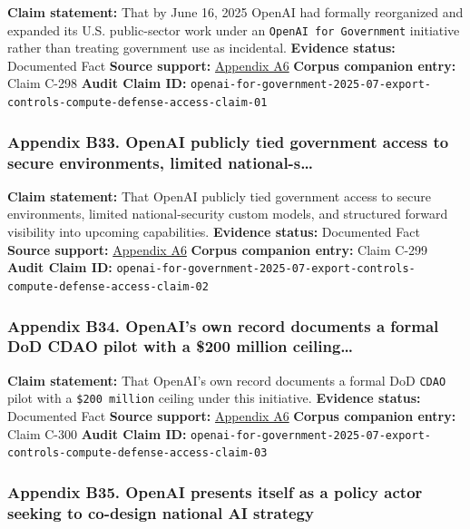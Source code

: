 \documentclass[
  american,
  11pt,
  letterpaper,
]{article}
\begin{document}
\textbf{Claim statement:} That by June 16, 2025 OpenAI had formally
reorganized and expanded its U.S. public-sector work under an
\texttt{OpenAI\ for\ Government} initiative rather than treating
government use as incidental. \textbf{Evidence status:} Documented Fact
\textbf{Source support:}
\hyperref[appendix-a6-introducing-openai-for-government]{Appendix A6}
\textbf{Corpus companion entry:} Claim C-298 \textbf{Audit Claim ID:}
\texttt{openai-for-government-2025-07-export-controls-compute-defense-access-claim-01}

\subsubsection{Appendix B33. OpenAI publicly tied government access to
secure environments, limited
national-s\ldots{}}\label{appendix-b33-openai-publicly-tied-government-access-to-secure-environments-limited-national-s}

\textbf{Claim statement:} That OpenAI publicly tied government access to
secure environments, limited national-security custom models, and
structured forward visibility into upcoming capabilities.
\textbf{Evidence status:} Documented Fact \textbf{Source support:}
\hyperref[appendix-a6-introducing-openai-for-government]{Appendix A6}
\textbf{Corpus companion entry:} Claim C-299 \textbf{Audit Claim ID:}
\texttt{openai-for-government-2025-07-export-controls-compute-defense-access-claim-02}

\subsubsection{Appendix B34. OpenAI's own record documents a formal DoD
CDAO pilot with a \$200 million
ceiling\ldots{}}\label{appendix-b34-openai-s-own-record-documents-a-formal-dod-cdao-pilot-with-a-200-million-ceiling}

\textbf{Claim statement:} That OpenAI's own record documents a formal
DoD \texttt{CDAO} pilot with a \texttt{\$200\ million} ceiling under
this initiative. \textbf{Evidence status:} Documented Fact
\textbf{Source support:}
\hyperref[appendix-a6-introducing-openai-for-government]{Appendix A6}
\textbf{Corpus companion entry:} Claim C-300 \textbf{Audit Claim ID:}
\texttt{openai-for-government-2025-07-export-controls-compute-defense-access-claim-03}

\subsubsection{Appendix B35. OpenAI presents itself as a policy actor
seeking to co-design national AI
strategy}\label{appendix-b35-openai-presents-itself-as-a-policy-actor-seeking-to-co-design-national-ai-strategy}
\end{document}

